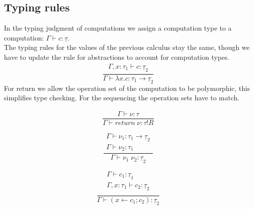 \documentclass[12pt]{article}
\newcommand\type[0]{\tau}
\newcommand\tarr[2]{#1 \rightarrow #2}
\newcommand\ctype[0]{\underline{\type}}
\newcommand\cdirt[2]{#1 ! #2}
\newcommand\val[0]{\nu}
\newcommand\vabs[2]{\lambda #1 . #2}
\newcommand\comp[0]{c}
\newcommand\creturn[1]{\textit{return} \; #1}
\newcommand\capp[2]{#1 \; #2}
\newcommand\cdo[3]{#1 \leftarrow #2 ; #3}
\begin{document}
\subsection{Typing rules}
In the typing judgment of computations we assign a computation type to a computation: $\Gamma \vdash \comp : \ctype$. \\
The typing rules for the values of the previous calculus stay the same, though we have to update the rule for abstractions to account for computation types. \\
\[\frac{
	\begin{array}{l}
	\Gamma, x : \type_1 \vdash \comp : \ctype_2
	\end{array}
}{
	\Gamma \vdash \vabs{x}{\comp} : \tarr{\type_1}{\ctype_2}
}\]
For return we allow the operation set of the computation to be polymorphic, this simplifies type checking. For the sequencing the operation sets have to match. \\
\vspace{10pt}
\begin{minipage}{0.33\textwidth}
\[\frac{
	\begin{array}{l}
	\Gamma \vdash \val : \type
	\end{array}
}{
	\Gamma \vdash \creturn{\val} : \cdirt{\type}{R}
}\]
\end{minipage}
\begin{minipage}{0.33\textwidth}
\[\frac{
	\begin{array}{l}
	\Gamma \vdash \val_1 : \tarr{\type_1}{\ctype_2} \\
	\Gamma \vdash \val_2 : \type_1
	\end{array}
}{
	\Gamma \vdash \capp{\val_1}{\val_2} : \ctype_2
}\]
\end{minipage}
\begin{minipage}{0.33\textwidth}
\[\frac{
	\begin{array}{l}
	\Gamma \vdash \comp_1 : \ctype_1 \\
	\Gamma , x : \type_1 \vdash \comp_2 : \ctype_2 \\
	\end{array}
}{
	\Gamma \vdash (\cdo{x}{\comp_1}{\comp_2}) : \ctype_2
}\]
\end{minipage}
\end{document}

